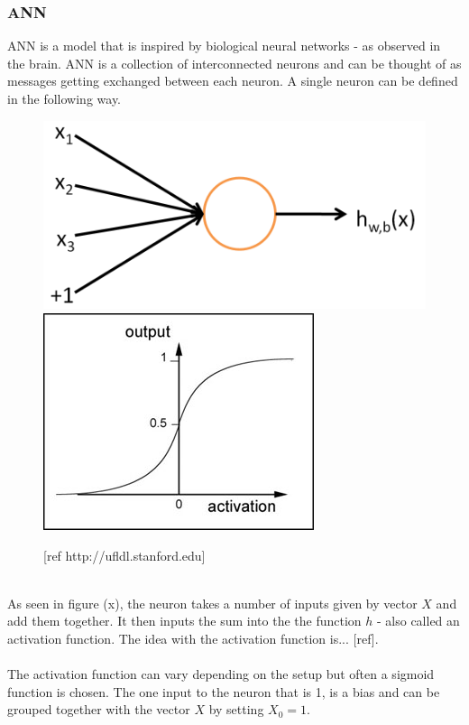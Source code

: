 \documentclass[11pt, a4paper]{article}
\begin{document}
\subsubsection{ANN}
ANN is a model that is inspired by biological neural networks - as observed in the brain. ANN is a collection of interconnected neurons and can be thought of as messages getting exchanged between each neuron. A single neuron can be defined in the following way.
\begin{figure}[!ht]
\centering
\includegraphics[scale=0.2]{SingleNeuron}
\includegraphics[scale=0.5]{sigmoid}
\caption{[ref http://ufldl.stanford.edu]}
\end{figure}
\\
As seen in figure (x), the neuron takes a number of inputs given by vector $ X $ and add them together. It then inputs the sum into the the function $ h $ - also called an activation function. The idea with the activation function is... [ref].
\\
\\
The activation function can vary depending on the setup but often a sigmoid function is chosen. The one input to the neuron that is 1, is a bias and can be grouped together with the vector $ X $ by setting $ X_0 = 1 $.
\\
\\
\end{document}
